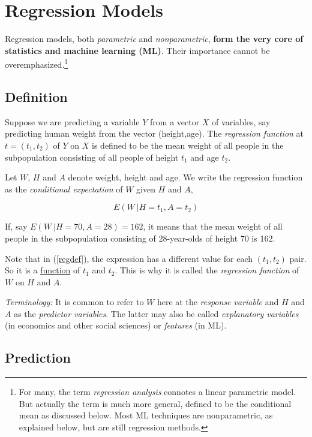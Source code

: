 \section{Regression Models} 

Regression models, both \textit{parametric} and \textit{nonparametric},
\textbf{form the very core of statistics and machine learning (ML)}.  Their
importance cannot be overemphasized.\footnote{For many, the term
\textit{regression analysis} connotes a linear parametric model.  But
actually the term is much more general, defined to be the conditional
mean as discussed below.  Most ML techniques are nonparametric, as
explained below, but are still regression methods.}

\subsection{Definition}

Suppose we are predicting a variable $Y$ from a vector $X$ of variables,
say predicting human weight from the vector (height,age).  The
\textit{regression function} at $t = (t_1,t_2)$ of $Y$ on $X$ is defined
to be the mean weight of all people in the subpopulation consisting of
all people of height $t_1$ and age $t_2$.

Let $W$, $H$ and $A$ denote weight, height and age.  We write the
regression function as the \textit{conditional expectation} of $W$ given
$H$ and $A$, 

\begin{equation}
\label{regdef}
E(W ~| H=t_1, A=t_2)
\end{equation}

If, say $E(W ~| H=70, A=28) = 162$, it means that the mean weight of all
people in the subpopulation consisting of 28-year-olds of height 70 is
162.

Note that in (\ref{regdef}), the expression has a different value for
each $(t_1,t_2)$ pair.  So it is a \underline{function} of $t_1$ and
$t_2$.  This is why it is called the \textit{regression function} of $W$ on $H$
and $A$.

\textit{Terminology:} It is common to refer to $W$ here at the
\textit{response variable} and $H$ and $A$ as the \textit{predictor
variables}.  The latter may also be called \textit{explanatory
variables} (in economics and other social sciences) or \textit{features}
(in ML).

\subsection{Prediction}

